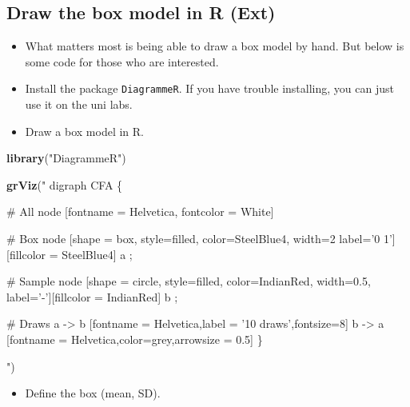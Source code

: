 \documentclass[]{article}
\newenvironment{Shaded}{\begin{snugshade}}{\end{snugshade}}
\newcommand{\KeywordTok}[1]{\textcolor[rgb]{0.13,0.29,0.53}{\textbf{#1}}}
\newcommand{\NormalTok}[1]{#1}
\newcommand{\StringTok}[1]{\textcolor[rgb]{0.31,0.60,0.02}{#1}}
\providecommand{\tightlist}{%
  \setlength{\itemsep}{0pt}\setlength{\parskip}{0pt}}
\begin{document}
\hypertarget{draw-the-box-model-in-r-ext}{%
\subsection{Draw the box model in R (Ext)}\label{draw-the-box-model-in-r-ext}}

\begin{itemize}
\item
  What matters most is being able to draw a box model by hand. But below is some code for those who are interested.
\item
  Install the package \texttt{DiagrammeR}. If you have trouble installing, you can just use it on the uni labs.
\item
  Draw a box model in R.
\end{itemize}

\begin{Shaded}
\begin{Highlighting}[]
\KeywordTok{library}\NormalTok{(}\StringTok{"DiagrammeR"}\NormalTok{)}

\KeywordTok{grViz}\NormalTok{(}\StringTok{" }
\StringTok{  digraph CFA \{}

\StringTok{  # All}
\StringTok{  node [fontname = Helvetica, fontcolor = White]}

\StringTok{    # Box}
\StringTok{    node [shape = box, style=filled, color=SteelBlue4, width=2 label='0  1'][fillcolor = SteelBlue4]}
\StringTok{    a ; }

\StringTok{    # Sample}
\StringTok{    node [shape = circle, style=filled, color=IndianRed, width=0.5, label='-'][fillcolor = IndianRed]}
\StringTok{    b ; }

\StringTok{    # Draws}
\StringTok{    a -> b [fontname = Helvetica,label = '10 draws',fontsize=8]}
\StringTok{    b -> a  [fontname = Helvetica,color=grey,arrowsize = 0.5]}
\StringTok{  \}}

\StringTok{"}\NormalTok{)}
\end{Highlighting}
\end{Shaded}

\begin{itemize}
\tightlist
\item
  Define the box (mean, SD).
\end{itemize}
\end{document}
